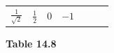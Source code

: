 {{\begin{center}
\begin{xtabular}[t]{|l|l|l|l|l|l|l|}
    
        
                  \begin{math}\frac{1}{\sqrt{2}}\end{math}
                 &
    
    
        
                  \begin{math}\frac{1}{2}\end{math}
                 &
    
    
        0 &
    
    
        
                  \begin{math}-1\end{math}
     \tabularnewline{}
    \end{xtabular}
      \end{center}
    \begin{center}{\small\bfseries Table 14.8}\end{center}
    
    \addtocounter{footnote}{-0}
    
          } %
        }{%
        }
